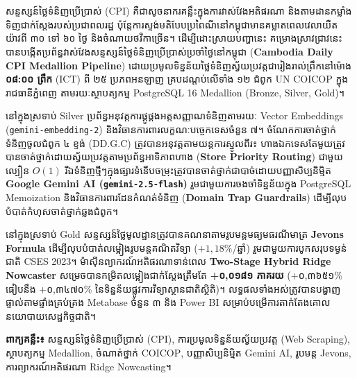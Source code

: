 \chapter*{\centering \fontsize{14pt}{16pt}\selectfont{\khmerfontmoul អត្ថបទសង្ខេប}}  

\begin{khmer}
\justifying
\khmerfontsr
\fontsize{12pt}{18pt}\selectfont
សន្ទស្សន៍ថ្លៃទំនិញប្រើប្រាស់ (\textenglish{CPI}) គឺជាសូចនាករគន្លឹះក្នុងការវាស់វែងអតិផរណា និងតាមដានកម្លាំងទិញជាក់ស្តែងរបស់ប្រជាពលរដ្ឋ ប៉ុន្តែការស្ទង់មតិបែបប្រពៃណីនៅកម្ពុជាមានគម្លាតពេលវេលាយឺតយ៉ាវពី ៣០ ទៅ ៦០ ថ្ងៃ និងចំណាយថវិកាច្រើន។ ដើម្បីដោះស្រាយបញ្ហានេះ គម្រោងស្រាវជ្រាវនេះបានបង្កើតប្រព័ន្ធវាស់វែងសន្ទស្សន៍ថ្លៃទំនិញប្រើប្រាស់ប្រចាំថ្ងៃនៅកម្ពុជា (\textenglish{\textbf{Cambodia Daily CPI Medallion Pipeline}}) ដោយប្រមូលទិន្នន័យថ្លៃទំនិញស្វ័យប្រវត្តជារៀងរាល់ព្រឹកនៅម៉ោង \textbf{០៨:០០ ព្រឹក} (\textenglish{ICT}) ពី ២៥ ប្រភពអនឡាញ គ្របដណ្តប់លើទាំង ១២ ជំពូក \textenglish{UN COICOP} ក្នុងរាជធានីភ្នំពេញ តាមរយៈស្ថាបត្យកម្ម \textenglish{PostgreSQL 16 Medallion (Bronze, Silver, Gold)}។

នៅក្នុងស្រទាប់ \textenglish{Silver} ប្រព័ន្ធអនុវត្តការផ្គូផ្គងអត្តសញ្ញាណទំនិញតាមរយៈ \textenglish{Vector Embeddings (\texttt{gemini-embedding-2})} និងវិធានការពារលក្ខណៈបច្ចេកទេសចំនួន ៧។ ចំណែកការចាត់ថ្នាក់ទំនិញចូលជំពូក ៤ ខ្ទង់ (\textenglish{DD.G.C}) ត្រូវបានអនុវត្តតាមយន្តការស្នូលពីរ៖ ហាងឯកទេសតែមួយត្រូវបានចាត់ថ្នាក់ដោយស្វ័យប្រវត្តតាមប្រព័ន្ធអាទិភាពហាង (\textenglish{\textbf{Store Priority Routing}}) ជាមួយល្បឿន $O(1)$ រីឯទំនិញថ្មីៗក្នុងផ្សារទំនើបចម្រុះត្រូវបានចាត់ថ្នាក់ជាបាច់ដោយបញ្ញាសិប្បនិម្មិត \textenglish{\textbf{Google Gemini AI (\texttt{gemini-2.5-flash})}} រួមជាមួយការចងចាំទិន្នន័យក្នុង \textenglish{PostgreSQL Memoization} និងវិធានការពារដែនកំណត់ទំនិញ (\textenglish{\textbf{Domain Trap Guardrails}}) ដើម្បីលុបបំបាត់កំហុសចាត់ថ្នាក់ឆ្លងជំពូក។

នៅក្នុងស្រទាប់ \textenglish{Gold} សន្ទស្សន៍ថ្លៃមូលដ្ឋានត្រូវបានគណនាតាមរូបមន្តមធ្យមធរណីមាត្រ \textenglish{\textbf{Jevons Formula}} ដើម្បីលុបបំបាត់លម្អៀងរូបមន្តគណិតវិទ្យា ($+1,18\%$/ឆ្នាំ) រួមជាមួយការបូកសរុបទម្ងន់ជាតិ \textenglish{CSES 2023}។ ម៉ាស៊ីនព្យាករណ៍អតិផរណាទាន់ពេល \textenglish{\textbf{Two-Stage Hybrid Ridge Nowcaster}} សម្រេចបានកម្រិតលម្អៀងជាក់ស្តែងត្រឹមតែ \textbf{+០,០១៨១ ភាគរយ} (+០,៣៦៥១\% ធៀបនឹង +០,៣៤៧០\% នៃទិន្នន័យផ្លូវការវិទ្យាស្ថានជាតិស្ថិតិ)។ លទ្ធផលទាំងអស់ត្រូវបានបង្ហាញផ្ទាល់តាមផ្ទាំងគ្រប់គ្រង \textenglish{Metabase} ចំនួន ៣ និង \textenglish{Power BI} សម្រាប់បម្រើការតាក់តែងគោលនយោបាយសេដ្ឋកិច្ចជាតិ។

\vspace{0.5cm}
\noindent \textbf{\khmerfont ពាក្យគន្លឹះ៖} សន្ទស្សន៍ថ្លៃទំនិញប្រើប្រាស់ (\textenglish{CPI}), ការប្រមូលទិន្នន័យស្វ័យប្រវត្ត (\textenglish{Web Scraping}), ស្ថាបត្យកម្ម \textenglish{Medallion}, ចំណាត់ថ្នាក់ \textenglish{COICOP}, បញ្ញាសិប្បនិម្មិត \textenglish{Gemini AI}, រូបមន្ត \textenglish{Jevons}, ការព្យាករណ៍អតិផរណា \textenglish{Ridge Nowcasting}។
\end{khmer}
\setmainfont{Times New Roman}